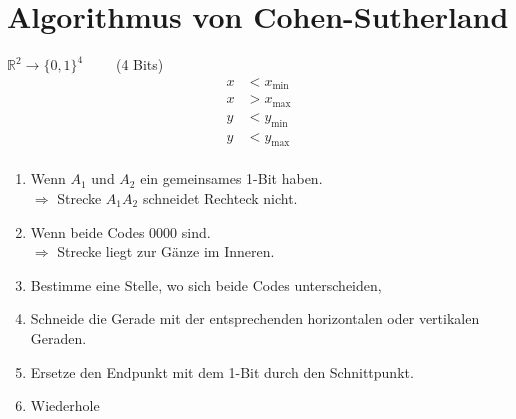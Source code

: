 \section{Algorithmus von Cohen-Sutherland}
$\mathbb{R}^2 \to \{0,1\}^4 \qquad$ (4 Bits)
\begin{align*}
 x &< x_\mathrm{min} \\
 x &> x_\mathrm{max} \\
 y &< y_\mathrm{min} \\
 y &< y_\mathrm{max} \\
\end{align*}
\begin{enumerate}
 \item Wenn $A_1$ und $A_2$ ein gemeinsames 1-Bit haben.\\
	$\Rightarrow$ Strecke $A_1A_2$ schneidet Rechteck nicht.
 \item Wenn beide Codes 0000 sind.\\
	$\Rightarrow$ Strecke liegt zur Gänze im Inneren.
 \item Bestimme eine Stelle, wo sich beide Codes unterscheiden,
 \item Schneide die Gerade mit der entsprechenden horizontalen oder vertikalen Geraden.
 \item Ersetze den Endpunkt mit dem 1-Bit durch den Schnittpunkt.
 \item Wiederhole
\end{enumerate}




